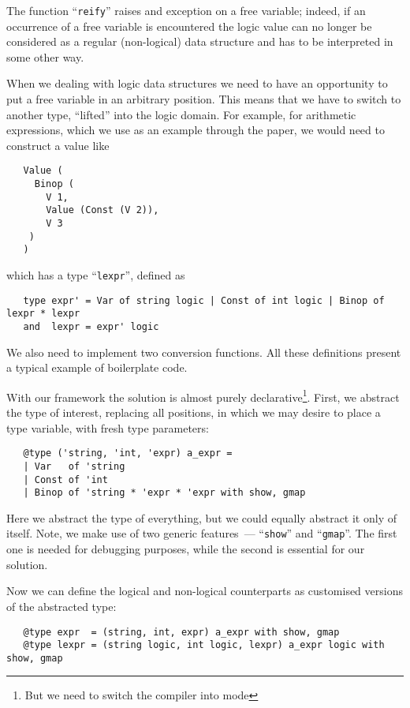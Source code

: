 The function ``\lstinline{reify}'' raises and exception on a free variable; indeed, if an occurrence of a free variable
is encountered the logic value can no longer be considered as a regular (non-logical) data structure and has to be interpreted
in some other way.

When we dealing with logic data structures we need to have an opportunity to put a free variable in an arbitrary
position. This means that we have to switch to another type, ``lifted'' into the logic domain. For example,
for arithmetic expressions, which we use as an example through the paper, we would need to construct a value like

\begin{lstlisting}
   Value (
     Binop (
       V 1, 
       Value (Const (V 2)),
       V 3
    )
   )
\end{lstlisting}

which has a type ``\lstinline{lexpr}'', defined as

\begin{lstlisting}
   type expr' = Var of string logic | Const of int logic | Binop of lexpr * lexpr
   and  lexpr = expr' logic
\end{lstlisting}

We also need to implement two conversion functions. All these definitions present a typical example of boilerplate code.

With our framework the solution is almost purely declarative\footnote{But we need to switch the compiler into  mode}.
First, we abstract the type of interest, replacing all positions, in which we may desire to place a type variable, with
fresh type parameters:

\begin{lstlisting}
   @type ('string, 'int, 'expr) a_expr =
   | Var   of 'string
   | Const of 'int
   | Binop of 'string * 'expr * 'expr with show, gmap
\end{lstlisting}

Here we abstract the type of everything, but we could equally abstract it only of itself. Note, we make use of two
generic features~--- ``\lstinline{show}'' and ``\lstinline{gmap}''. The first one is needed for debugging purposes, while
the second is essential for our solution.

Now we can define the logical and non-logical counterparts as customised versions of the abstracted type:

\begin{lstlisting}
   @type expr  = (string, int, expr) a_expr with show, gmap
   @type lexpr = (string logic, int logic, lexpr) a_expr logic with show, gmap
\end{lstlisting}

